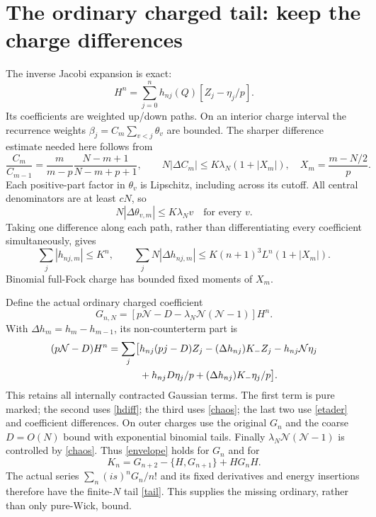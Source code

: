 \documentclass[11pt]{article}
\newcommand{\NN}{\mathcal N}
\begin{document}
\newpage
\section{The ordinary charged tail: keep the charge differences}
The inverse Jacobi expansion is exact:
\begin{equation}
 H^n=\sum_{j=0}^nh_{nj}(Q)[Z_j-\eta_j/p].
\end{equation}
Its coefficients are weighted up/down paths. On an interior charge
interval the recurrence weights $\beta_j=C_m\sum_{v<j}\theta_v$
are bounded. The sharper difference estimate needed here follows
from
\begin{equation}
 \frac{C_m}{C_{m-1}}=
 \frac m{m-p}\frac{N-m+1}{N-m+p+1},\qquad
 N|\Delta C_m|\le K\lambda_N(1+|X_m|),
 \quad X_m=\frac{m-N/2}{p}.
\end{equation}
Each positive-part factor in $\theta_v$ is Lipschitz, including
across its cutoff. All central denominators are at least $cN$, so
\begin{equation}
 N|\Delta\theta_{v,m}|\le K\lambda_Nv
 \quad\text{for every }v.
\end{equation}
Taking one difference along each path, rather than differentiating
every coefficient simultaneously, gives
\begin{equation}\label{hdiff}
 \sum_j|h_{nj,m}|\le K^n,\qquad
 \sum_jN|\Delta h_{nj,m}|
 \le K(n+1)^3L^n(1+|X_m|).
\end{equation}
Binomial full-Fock charge has bounded fixed moments of $X_m$.

Define the actual ordinary charged coefficient
\begin{equation}
 G_{n,N}=[p\NN-D-\lambda_N\NN(\NN-1)]H^n.
\end{equation}
With $\Delta h_m=h_m-h_{m-1}$, its non-counterterm part is
\begin{align}\label{reassembly}
 (p\NN-D)H^n=\sum_j\bigl[&h_{nj}(pj-D)Z_j
       -(\Delta h_{nj})K_-Z_j-h_{nj}\NN\eta_j\notag\\
       &+h_{nj}D\eta_j/p
       +(\Delta h_{nj})K_-\eta_j/p\bigr].
\end{align}
This retains all internally contracted Gaussian terms. The first
term is pure marked; the second uses \eqref{hdiff}; the third uses
\eqref{chaos}; the last two use \eqref{etader} and coefficient
differences. On outer charges use the original $G_n$ and the coarse
$D=O(N)$ bound with exponential binomial tails. Finally
$\lambda_N\NN(\NN-1)$ is controlled by \eqref{chaos}.
Thus \eqref{envelope} holds for $G_n$ and for
\begin{equation}
 K_n=G_{n+2}-\{H,G_{n+1}\}+HG_nH.
\end{equation}
The actual series $\sum_n(is)^nG_n/n!$ and its fixed derivatives
and energy insertions therefore have the finite-$N$ tail
\eqref{tail}. This supplies the missing ordinary, rather than
only pure-Wick, bound.
\end{document}
